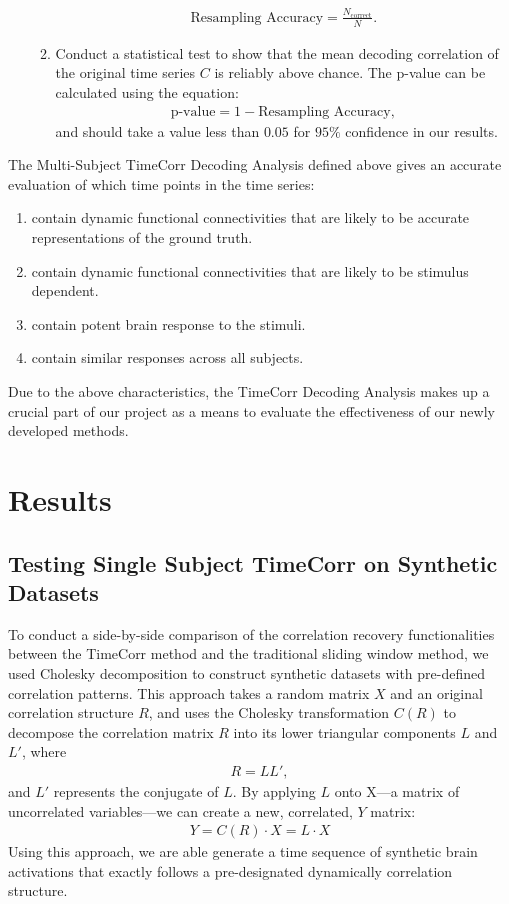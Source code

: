 \documentclass[11pt]{article}
\begin{document}
\begin{enumerate}
\begin{enumerate}
\begin{align*}
\text{Resampling Accuracy} = \frac{N_{\text{correct}}}{N}.
\end{align*}
\item Conduct a statistical test to show that the mean decoding correlation of the original time series $C$ is reliably above chance. The p-value can be calculated using the equation:
\begin{align*}
\text{p-value} = 1-\text{Resampling Accuracy},
\end{align*}
and should take a value less than $0.05$ for $95\%$ confidence in our results.
\end{enumerate}
\end{enumerate}

The Multi-Subject TimeCorr Decoding Analysis defined above gives an accurate evaluation of which time points in the time series:

\begin{enumerate}
\item contain dynamic functional connectivities that are likely to be accurate representations of the ground truth.
\item contain dynamic functional connectivities that are likely to be stimulus dependent.
\item contain potent brain response to the stimuli.
\item contain similar responses across all subjects.
\end{enumerate}

Due to the above characteristics, the TimeCorr Decoding Analysis makes up a crucial part of our project as a means to evaluate the effectiveness of our newly developed methods.


\newpage
\section{Results}
\subsection{Testing Single Subject TimeCorr on Synthetic Datasets}
To conduct a side-by-side comparison of the correlation recovery functionalities between the TimeCorr method and the traditional sliding window method, we used Cholesky decomposition to construct synthetic datasets with pre-defined correlation patterns. This approach takes a random matrix $X$ and an original correlation structure $R$, and uses the Cholesky transformation $C(R)$ to decompose the correlation matrix $R$ into its lower triangular components $L$ and $L'$, where
\begin{align*}
R = LL',
\end{align*}
and $L'$ represents the conjugate of $L$. By applying $L$ onto X---a matrix of uncorrelated variables---we can create a new, correlated, $Y$ matrix:
\begin{align*}
Y = C(R) \cdot X = L \cdot X
\end{align*}
Using this approach, we are able generate a time sequence of synthetic brain activations that exactly follows a pre-designated dynamically correlation structure.
\end{document}

